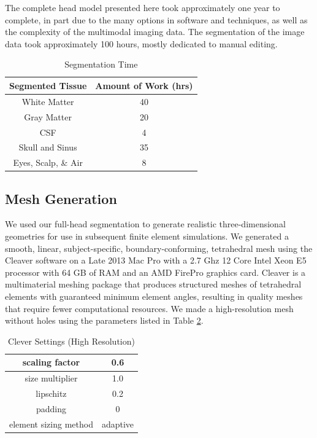 
The complete head model presented here took approximately one year to complete, in part due to the many options in software and techniques, as well as the complexity of the multimodal imaging data. The segmentation of the image data took approximately 100 hours, mostly dedicated to manual editing.

\begin{table}[H]
\centering
\caption{Segmentation Time}
\label{tab:seg}
\begin{tabular}{|c|c|}
\hline
Segmented Tissue    & Amount of Work (hrs) \\ \hline
White Matter       & 40                   \\ \hline
Gray Matter         & 20                   \\ \hline
CSF                 & 4                    \\ \hline
Skull and Sinus     & 35                   \\ \hline
Eyes, Scalp, \& Air & 8                    \\ \hline
\end{tabular}
\end{table}

\subsection{Mesh Generation}
\label{sec:mesh}


We used our full-head segmentation to generate realistic three-dimensional geometries for use in subsequent finite element simulations. We generated a smooth, linear, subject-specific, boundary-conforming, tetrahedral mesh using the Cleaver software \cite{ref:cleaver} on a Late 2013 Mac Pro with a 2.7 Ghz 12 Core Intel Xeon E5 processor with 64 GB of RAM and an AMD FirePro graphics card. Cleaver is a multimaterial meshing package that produces structured meshes of tetrahedral elements with guaranteed minimum element angles, resulting in quality meshes that require fewer computational resources. We made a high-resolution mesh without holes using the parameters listed in Table \ref{tab:cleaver}.
\begin{table}[H]
\centering
\caption{Clever Settings (High Resolution)}
\label{tab:cleaver}
\begin{tabular}{|c|c|}
\hline
scaling factor                    & 0.6                 \\ \hline
size multiplier                   & 1.0                 \\ \hline
lipschitz                         & 0.2                 \\ \hline
padding                           & 0                   \\ \hline
element sizing method             & adaptive            \\ \hline
\end{tabular}
\end{table}

